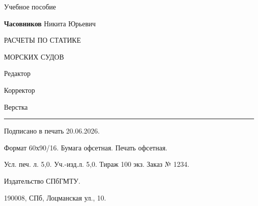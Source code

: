 
\newpage
\thispagestyle {empty}

\begin{center}
    
    Учебное пособие

\end{center}

\vspace{2.0cm}

\begin{center}
    
    \textbf{Часовников} Никита Юрьевич

\end{center}

\vspace{2.0cm}

\begin{center}
    \Large
    \onehalfspacing
    { 
    РАСЧЕТЫ ПО СТАТИКЕ
    
    МОРСКИХ СУДОВ
    }
\end{center}

\vspace{3.5cm}

\begin{center}
    Редактор

    Корректор 

    Верстка 

\end{center}

\rule{\textwidth}{0.5pt}

{\footnotesize
Подписано в печать 20.06.2026.

Формат 60х90/16.
Бумага офсетная.
Печать офсетная.

Усл. печ. л. 5,0. Уч.-изд.л. 5,0. Тираж 100 экз. Заказ № 1234.

Издательство СПбГМТУ.

190008, СПб, Лоцманская ул., 10.}